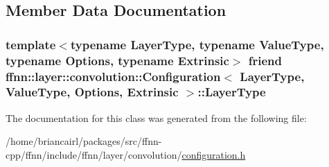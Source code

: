 \subsection{Member Data Documentation}
\hypertarget{classffnn_1_1layer_1_1convolution_1_1_configuration_a12e530507865f85db9b75c2d78493442}{
\subsubsection[{Layer\-Type}]{\setlength{\rightskip}{0pt plus 5cm}template$<$typename Layer\-Type, typename Value\-Type, typename Options, typename Extrinsic$>$ friend {\bf ffnn\-::layer\-::convolution\-::\-Configuration}$<$ Layer\-Type, Value\-Type, Options, Extrinsic $>$\-::Layer\-Type}}\label{classffnn_1_1layer_1_1convolution_1_1_configuration_a12e530507865f85db9b75c2d78493442}


The documentation for this class was generated from the following file\-:\begin{DoxyCompactItemize}
\item 
/home/briancairl/packages/src/ffnn-\/cpp/ffnn/include/ffnn/layer/convolution/\hyperlink{convolution_2configuration_8h}{configuration.\-h}\end{DoxyCompactItemize}
